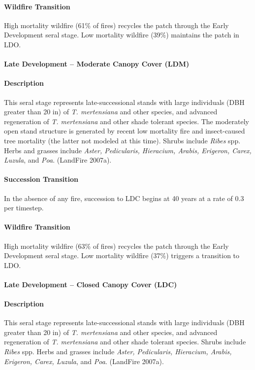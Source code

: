 \paragraph{Wildfire Transition} High mortality wildfire (61\% of fires) recycles the patch through the Early Development seral stage. Low mortality wildfire (39\%) maintains the patch in LDO.

\noindent\hrulefill

\paragraph{Late Development – Moderate Canopy Cover (LDM)}

\paragraph{Description} This seral stage represents late-successional stands with large individuals (DBH greater than 20 in) of \emph{T. mertensiana} and other species, and advanced regeneration of \emph{T. mertensiana} and other shade tolerant species. The moderately open stand structure is generated by recent low mortality fire and insect-caused tree mortality (the latter not modeled at this time). Shrubs include \emph{Ribes} spp. Herbs and grasses include \emph{Aster, Pedicularis, Hieracium, Arabis, Erigeron, Carex, Luzula}, and \emph{Poa}. (LandFire 2007a).

\paragraph{Succession Transition} In the absence of any fire, succession to LDC begins at 40 years at a rate of 0.3 per timestep.

\paragraph{Wildfire Transition} High mortality wildfire (63\% of fires) recycles the patch through the Early Development seral stage. Low mortality wildfire (37\%) triggers a transition to LDO. 

\noindent\hrulefill

\paragraph{Late Development – Closed Canopy Cover (LDC)}

\paragraph{Description} This seral stage represents late-successional stands with large individuals (DBH greater than 20 in) of \emph{T. mertensiana} and other species, and advanced regeneration of \emph{T. mertensiana} and other shade tolerant species. Shrubs include \emph{Ribes} spp. Herbs and grasses include \emph{Aster, Pedicularis, Hieracium, Arabis, Erigeron, Carex, Luzula}, and \emph{Poa}. (LandFire 2007a).


